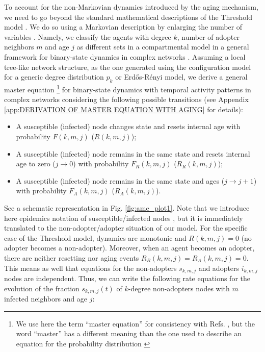 To account for the non-Markovian dynamics introduced by the aging mechanism, we need to go beyond the standard mathematical descriptions of the Threshold model \cite{gleeson-2007,gleeson-2008,gleeson-2013}. We do so using a Markovian description by enlarging the number of variables \cite{peralta-2020C,peralta-2020A}. Namely, we classify the agents with degree $k$, number of adopter neighbors $m$ and age $j$ as different sets in a compartmental model in a general framework for binary-state dynamics in complex networks \cite{watts-2002, gleeson-2011,gleeson-2013}. Assuming a local tree-like network structure, as the one generated using the configuration model for a generic degree distribution $p_k$ \cite{molloy-1995,newman-2001} or Erd\H{o}s-R\'enyi model, we derive a general master equation \footnote{We use here the term  ``master equation'' for consistency with  Refs. \cite{gleeson-2011,gleeson-2013}, but the word ``master'' has a different meaning than the one used to describe an equation for the probability distribution \cite{peralta-2020B}} for binary-state dynamics with temporal activity patterns in complex networks considering the following possible transitions (see Appendix \ref{app:DERIVATION OF MASTER EQUATION WITH AGING} for details):
\begin{itemize}
    \item A susceptible (infected) node changes state and resets internal age with probability $F (k,m,j)$ ($R (k,m,j)$);
    \item A susceptible (infected) node remains in the same state and resets internal age to zero ($j \to 0$) with probability $F_R (k,m,j)$ ($R_R (k,m,j)$);
    \item A susceptible (infected) node remains in the same state and ages ($j \to j+1$) with probability $F_{A} (k,m,j)$ ($R_{A} (k,m,j)$).
\end{itemize}
See a schematic representation in Fig. \ref{fig:ame_plot1}. Note that we introduce here epidemics notation of susceptible/infected nodes \cite{gleeson-2011,gleeson-2013}, but it is immediately translated to the non-adopter/adopter situation of our model. For the specific case of the Threshold model, dynamics are monotonic and $R (k,m,j) = 0$ (no adopter becomes a non-adopter). Moreover, when an agent becomes an adopter, there are neither resetting nor aging events $R_R (k,m,j) = R_A (k,m,j) = 0$. This means as well that equations for the non-adopters $s_{k,m,j}$ and adopters $i_{k,m,j}$ nodes are independent. Thus, we can write the following rate equations for the evolution of the fraction $s_{k,m,j} (t)$ of $k$-degree non-adopters nodes with $m$ infected neighbors and age $j$:
